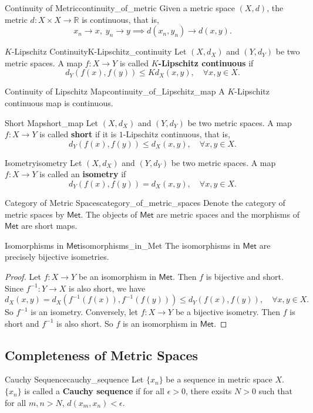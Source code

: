 \documentclass{report}
\begin{document}
\begin{proposition}{Continuity of Metric}{continuity_of_metric}
	Given a metric space $(X,d)$, the metric $d:X\times X\to \mathbb{R}$ is continuous, that is,
	\[
		x_n\to x,\; y_n\to y\implies d(x_n,y_n)\to d(x,y).
	\]
\end{proposition}
\begin{definition}{$K$-Lipschitz Continuity}{K-Lipschitz_continuity}
	Let $(X,d_X)$ and $(Y,d_Y)$ be two metric spaces. A map $f:X\to Y$ is called \textbf{$K$-Lipschitz continuous} if
	\[
		d_Y(f(x),f(y))\le Kd_X(x,y),\quad\forall x,y\in X.
	\]
\end{definition}
\begin{proposition}{Continuity of Lipschitz Map}{continuity_of_Lipschitz_map}
	A $K$-Lipschitz continuous map is continuous.
\end{proposition}
\begin{definition}{Short Map}{short_map}
	Let $(X,d_X)$ and $(Y,d_Y)$ be two metric spaces. A map $f:X\to Y$ is called \textbf{short} if it is $1$-Lipschitz continuous, that is,
	\[
		d_Y(f(x),f(y))\le d_X(x,y),\quad\forall x,y\in X.
	\]
\end{definition}
\begin{definition}{Isometry}{isometry}
	Let $(X,d_X)$ and $(Y,d_Y)$ be two metric spaces. A map $f:X\to Y$ is called an \textbf{isometry} if
	\[
		d_Y(f(x),f(y))=d_X(x,y),\quad\forall x,y\in X.
	\]	
\end{definition}
\begin{definition}{Category of Metric Spaces}{category_of_metric_spaces}
	Denote the category of metric spaces by $\mathsf{Met}$. The objects of $\mathsf{Met}$ are metric spaces and the morphisms of $\mathsf{Met}$ are short maps.
\end{definition}
\begin{proposition}{Isomorphisms in $\mathsf{Met}$}{isomorphisms_in_Met}
	The isomorphisms in $\mathsf{Met}$ are precisely bijective isometries.
\end{proposition}
\begin{proof}
	Let $f:X\to Y$ be an isomorphism in $\mathsf{Met}$. Then $f$ is bijective and short. Since $f^{-1}:Y\to X$ is also short, we have
	\[
		d_X(x,y)=d_X(f^{-1}(f(x)),f^{-1}(f(y)))\le d_Y(f(x),f(y)),\quad\forall x,y\in X.
	\]
	So $f^{-1}$ is an isometry. Conversely, let $f:X\to Y$ be a bijective isometry. Then $f$ is short and $f^{-1}$ is also short. So $f$ is an isomorphism in $\mathsf{Met}$.
\end{proof}
\subsection{Completeness of Metric Spaces}
\begin{definition}{Cauchy Sequence}{cauchy_sequence}
	Let $\{x_n\}$ be a sequence in metric space $X$. $\{x_n\}$ is called a \textbf{Cauchy sequence} if for all $\epsilon>0$, there exsits $N>0$ such that for all $m,n>N$, $d(x_m,x_n)<\epsilon$.
\end{definition}
\end{document}
